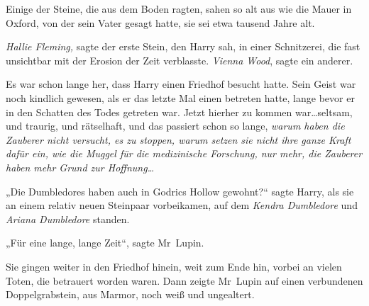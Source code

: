 Einige der Steine, die aus dem Boden ragten, sahen so alt aus wie die Mauer in Oxford, von der sein Vater gesagt hatte, sie sei etwa tausend Jahre alt.

\emph{Hallie Fleming,} sagte der erste Stein, den Harry sah, in einer Schnitzerei, die fast unsichtbar mit der Erosion der Zeit verblasste. \emph{Vienna Wood}, sagte ein anderer.

Es war schon lange her, dass Harry einen Friedhof besucht hatte. Sein Geist war noch kindlich gewesen, als er das letzte Mal einen betreten hatte, lange bevor er in den Schatten des Todes getreten war. Jetzt hierher zu kommen war…seltsam, und traurig, und rätselhaft, und das passiert schon so lange, \emph{warum haben die Zauberer nicht versucht, es zu stoppen, warum setzen sie nicht ihre ganze Kraft dafür ein, wie die Muggel für die medizinische Forschung, nur mehr, die Zauberer haben mehr Grund zur Hoffnung…}

„Die Dumbledores haben auch in Godrics Hollow gewohnt?“ sagte Harry, als sie an einem relativ neuen Steinpaar vorbeikamen, auf dem \emph{Kendra Dumbledore} und \emph{Ariana Dumbledore} standen.

„Für eine lange, lange Zeit“, sagte Mr~Lupin.


Sie gingen weiter in den Friedhof hinein, weit zum Ende hin, vorbei an vielen Toten, die betrauert worden waren. Dann zeigte Mr~Lupin auf einen verbundenen Doppelgrabstein, aus Marmor, noch weiß und ungealtert.

